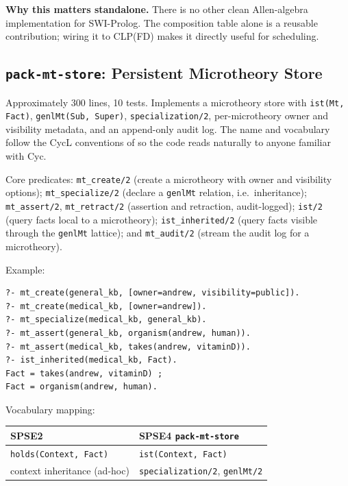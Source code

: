 \documentclass[11pt,letterpaper]{article}
\begin{document}
\textbf{Why this matters standalone.} There is no other clean
Allen-algebra implementation for SWI-Prolog. The composition table alone
is a reusable contribution; wiring it to CLP(FD) makes it directly useful
for scheduling.

\subsection{\texttt{pack-mt-store}: Persistent Microtheory Store}
\label{sec:mt}

Approximately 300 lines, 10 tests. Implements a microtheory store with
\texttt{ist(Mt, Fact)}, \texttt{genlMt(Sub, Super)},
\texttt{specialization/2}, per-microtheory owner and visibility metadata,
and an append-only audit log. The name and vocabulary follow the CycL
conventions of \citet{guha-lenat-cyc-1990} so the code reads naturally to
anyone familiar with Cyc.

Core predicates: \texttt{mt\_create/2} (create a microtheory with owner
and visibility options); \texttt{mt\_specialize/2} (declare a
\texttt{genlMt} relation, i.e.\ inheritance); \texttt{mt\_assert/2},
\texttt{mt\_retract/2} (assertion and retraction, audit-logged);
\texttt{ist/2} (query facts local to a microtheory);
\texttt{ist\_inherited/2} (query facts visible through the
\texttt{genlMt} lattice); and \texttt{mt\_audit/2} (stream the audit log
for a microtheory).

Example:

\begin{lstlisting}
?- mt_create(general_kb, [owner=andrew, visibility=public]).
?- mt_create(medical_kb, [owner=andrew]).
?- mt_specialize(medical_kb, general_kb).
?- mt_assert(general_kb, organism(andrew, human)).
?- mt_assert(medical_kb, takes(andrew, vitaminD)).
?- ist_inherited(medical_kb, Fact).
Fact = takes(andrew, vitaminD) ;
Fact = organism(andrew, human).
\end{lstlisting}

Vocabulary mapping:

\begin{center}
\begin{tabular}{@{}ll@{}}
\toprule
SPSE2 & SPSE4 \texttt{pack-mt-store} \\
\midrule
\texttt{holds(Context, Fact)} & \texttt{ist(Context, Fact)} \\
context inheritance (ad-hoc)  & \texttt{specialization/2}, \texttt{genlMt/2} \\
\bottomrule
\end{tabular}
\end{center}
\end{document}

